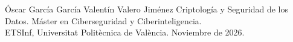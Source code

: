 \documentclass[12pt,a4paper]{article}
\begin{document}
         {Óscar García García \qquad Valentín Valero Jiménez}
         {Criptología y Seguridad de los Datos. Máster en Ciberseguridad y Ciberinteligencia.\\
          ETSInf, Universitat Politècnica de València. Noviembre de 2026.}






\end{document}
